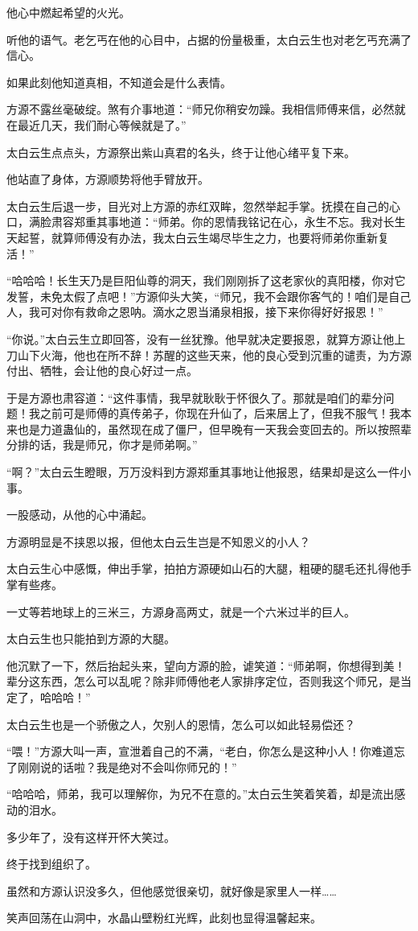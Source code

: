 \begin{this_body}
他心中燃起希望的火光。

听他的语气。老乞丐在他的心目中，占据的份量极重，太白云生也对老乞丐充满了信心。

如果此刻他知道真相，不知道会是什么表情。

方源不露丝毫破绽。煞有介事地道：“师兄你稍安勿躁。我相信师傅来信，必然就在最近几天，我们耐心等候就是了。”

太白云生点点头，方源祭出紫山真君的名头，终于让他心绪平复下来。

他站直了身体，方源顺势将他手臂放开。

太白云生后退一步，目光对上方源的赤红双眸，忽然举起手掌。抚摸在自己的心口，满脸肃容郑重其事地道：“师弟。你的恩情我铭记在心，永生不忘。我对长生天起誓，就算师傅没有办法，我太白云生竭尽毕生之力，也要将师弟你重新复活！”

“哈哈哈！长生天乃是巨阳仙尊的洞天，我们刚刚拆了这老家伙的真阳楼，你对它发誓，未免太假了点吧！”方源仰头大笑，“师兄，我不会跟你客气的！咱们是自己人，我可对你有救命之恩呐。滴水之恩当涌泉相报，接下来你得好好报恩！”

“你说。”太白云生立即回答，没有一丝犹豫。他早就决定要报恩，就算方源让他上刀山下火海，他也在所不辞！苏醒的这些天来，他的良心受到沉重的谴责，为方源付出、牺牲，会让他的良心好过一点。

于是方源也肃容道：“这件事情，我早就耿耿于怀很久了。那就是咱们的辈分问题！我之前可是师傅的真传弟子，你现在升仙了，后来居上了，但我不服气！我本来也是力道蛊仙的，虽然现在成了僵尸，但早晚有一天我会变回去的。所以按照辈分排的话，我是师兄，你才是师弟啊。”

“啊？”太白云生瞪眼，万万没料到方源郑重其事地让他报恩，结果却是这么一件小事。

一股感动，从他的心中涌起。

方源明显是不挟恩以报，但他太白云生岂是不知恩义的小人？

太白云生心中感慨，伸出手掌，拍拍方源硬如山石的大腿，粗硬的腿毛还扎得他手掌有些疼。

一丈等若地球上的三米三，方源身高两丈，就是一个六米过半的巨人。

太白云生也只能拍到方源的大腿。

他沉默了一下，然后抬起头来，望向方源的脸，谑笑道：“师弟啊，你想得到美！辈分这东西，怎么可以乱呢？除非师傅他老人家排序定位，否则我这个师兄，是当定了，哈哈哈！”

太白云生也是一个骄傲之人，欠别人的恩情，怎么可以如此轻易偿还？

“喂！”方源大叫一声，宣泄着自己的不满，“老白，你怎么是这种小人！你难道忘了刚刚说的话啦？我是绝对不会叫你师兄的！”

“哈哈哈，师弟，我可以理解你，为兄不在意的。”太白云生笑着笑着，却是流出感动的泪水。

多少年了，没有这样开怀大笑过。

终于找到组织了。

虽然和方源认识没多久，但他感觉很亲切，就好像是家里人一样……

笑声回荡在山洞中，水晶山壁粉红光辉，此刻也显得温馨起来。

\end{this_body}

